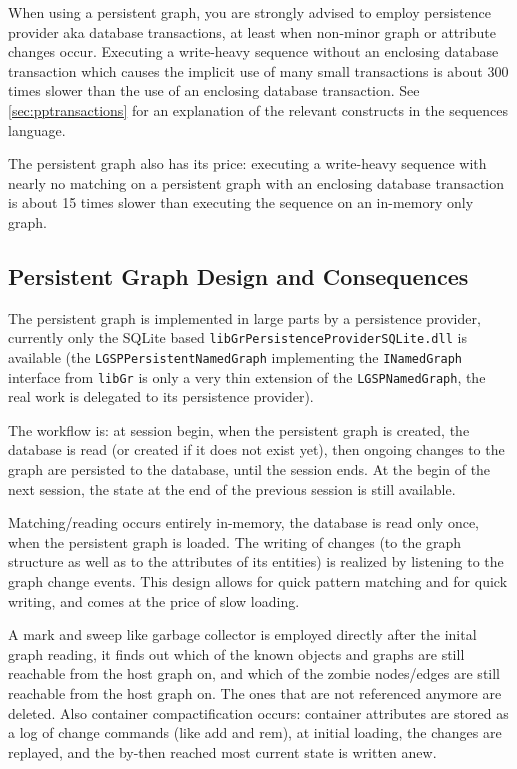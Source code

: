 \begin{warning}
When using a persistent graph, you are strongly advised to employ persistence provider aka database transactions, at least when non-minor graph or attribute changes occur.
Executing a write-heavy sequence without an enclosing database transaction which causes the implicit use of many small transactions is about 300 times slower than the use of an enclosing database transaction.
See \ref{sec:pptransactions} for an explanation of the relevant constructs in the sequences language.
\end{warning}

\begin{note}
The persistent graph also has its price: executing a write-heavy sequence with nearly no matching on a persistent graph with an enclosing database transaction is about 15 times slower than executing the sequence on an in-memory only graph.
\end{note}

\subsection*{Persistent Graph Design and Consequences}
The persistent graph is implemented in large parts by a persistence provider, currently only the SQLite based \texttt{libGrPersistenceProviderSQLite.dll} is available (the \texttt{LGSP\-Persistent\-Named\-Graph} implementing the \texttt{INamedGraph} interface from \texttt{libGr} is only a very thin extension of the \texttt{LGSPNamedGraph}, the real work is delegated to its persistence provider). 

The workflow is: at session begin, when the persistent graph is created, the database is read (or created if it does not exist yet), then ongoing changes to the graph are persisted to the database, until the session ends.
At the begin of the next session, the state at the end of the previous session is still available.

Matching/reading occurs entirely in-memory, the database is read only once, when the persistent graph is loaded.
The writing of changes (to the graph structure as well as to the attributes of its entities) is realized by listening to the graph change events.
This design allows for quick pattern matching and for quick writing, and comes at the price of slow loading.

A mark and sweep like garbage collector is employed directly after the inital graph reading, it finds out which of the known objects and graphs are still reachable from the host graph on, and which of the zombie nodes/edges are still reachable from the host graph on.
The ones that are not referenced anymore are deleted.
Also container compactification occurs: container attributes are stored as a log of change commands (like add and rem), at initial loading, the changes are replayed, and the by-then reached most current state is written anew.


